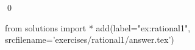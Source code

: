 
\begin{ex} 
  \label{ex:rational1}
  
  \qed
\end{ex} 
\begin{python0}
from solutions import *
add(label="ex:rational1",
    srcfilename='exercises/rational1/answer.tex') 
\end{python0}
